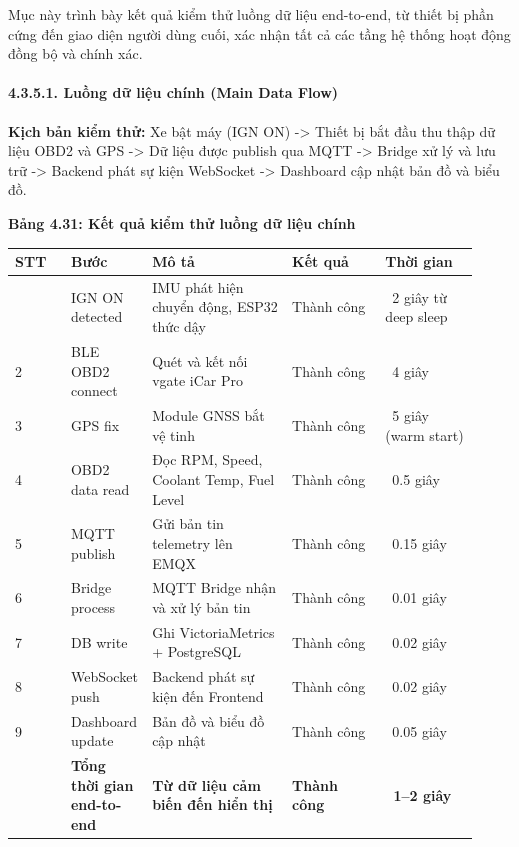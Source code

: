 \documentclass[13pt,a4paper]{extarticle}
\newcounter{none} %
\newcommand{\thesislongtableorignewline}{}
\let\thesislongtableorignewline\\
\renewcommand{\\}{\thesislongtableorignewline\hline}%
\let\\\thesislongtableorignewline
\newcommand{\thesistabletitle}[1]{%
  \begin{center}\textbf{#1}\end{center}%
}
\begin{document}
Mục này trình bày kết quả kiểm thử luồng dữ liệu end-to-end, từ thiết bị
phần cứng đến giao diện người dùng cuối, xác nhận tất cả các tầng hệ
thống hoạt động đồng bộ và chính xác.

\paragraph{4.3.5.1. Luồng dữ liệu chính (Main Data
Flow)}\label{4351-luux1ed3ng-dux1eef-liux1ec7u-chuxednh-main-data-flow}

\textbf{Kịch bản kiểm thử:} Xe bật máy (IGN ON) -\textgreater{} Thiết bị
bắt đầu thu thập dữ liệu OBD2 và GPS -\textgreater{} Dữ liệu được
publish qua MQTT -\textgreater{} Bridge xử lý và lưu trữ -\textgreater{}
Backend phát sự kiện WebSocket -\textgreater{} Dashboard cập nhật bản đồ
và biểu đồ.

\thesistabletitle{Bảng 4.31: Kết quả kiểm thử luồng dữ liệu chính}

{\def\LTcaptype{none} %
\begin{longtable}{|p{0.12\linewidth}|p{0.10\linewidth}|p{0.30\linewidth}|p{0.20\linewidth}|p{0.20\linewidth}|}
\hline \textbf{STT} & \textbf{Bước} & \textbf{Mô tả} & \textbf{Kết quả} & \textbf{Thời gian} \\
\hline
\endhead
\hline
\endlastfoot
1 & IGN ON detected & IMU phát hiện chuyển động, ESP32 thức dậy & Thành
công & ~2 giây từ deep sleep \\
2 & BLE OBD2 connect & Quét và kết nối vgate iCar Pro & Thành công &
~4 giây \\
3 & GPS fix & Module GNSS bắt vệ tinh & Thành công & ~5
giây (warm start) \\
4 & OBD2 data read & Đọc RPM, Speed, Coolant Temp, Fuel Level & Thành
công & ~0.5 giây \\
5 & MQTT publish & Gửi bản tin telemetry lên EMQX & Thành công &
~0.15 giây \\
6 & Bridge process & MQTT Bridge nhận và xử lý bản tin & Thành công &
~0.01 giây \\
7 & DB write & Ghi VictoriaMetrics + PostgreSQL & Thành công &
~0.02 giây \\
8 & WebSocket push & Backend phát sự kiện đến Frontend & Thành công &
~0.02 giây \\
9 & Dashboard update & Bản đồ và biểu đồ cập nhật & Thành công &
~0.05 giây \\
& \textbf{Tổng thời gian end-to-end} & \textbf{Từ dữ liệu cảm biến đến
hiển thị} & \textbf{Thành công} & \textbf{~1--2 giây} \\
\end{longtable}
}
\end{document}
